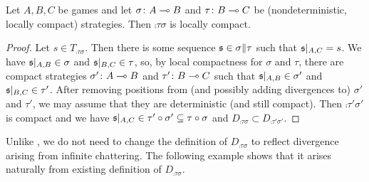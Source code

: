 \documentclass{article}
\begin{document}
\begin{proposition}
  Let $A,B,C$ be games and let $\sigma\colon A\multimap B$ and $\tau\colon B\multimap C$ be (nondeterministic, locally compact) strategies.  Then $\comp\tau\sigma$ is locally compact.
  \begin{proof}
    Let $s\in T_{\comp\tau\sigma}$.  Then there is some sequence $\mathfrak s\in\sigma\|\tau$ such that $\mathfrak s\vert_{A,C}=s$.  We have $\mathfrak s\vert_{A,B}\in\sigma$ and $\mathfrak s\vert_{B,C}\in\tau$, so, by local compactness for $\sigma$ and $\tau$, there are compact strategies $\sigma'\colon A\multimap B$ and $\tau'\colon B\multimap C$ such that $\mathfrak s\vert_{A,B}\in\sigma'$ and $\mathfrak s\vert_{B,C}\in\tau'$.  After removing positions from (and possibly adding divergences to) $\sigma'$ and $\tau'$, we may assume that they are deterministic (and still compact).  Then $\comp{\tau'}{\sigma'}$ is compact and we have $\mathfrak s\vert_{A,C}\in\tau' \circ \sigma'\subseteq\tau \circ \sigma$ and $D_{\comp\tau\sigma}\subset D_{\comp{\tau'}{\sigma'}}$.
  \end{proof}
\end{proposition}

Unlike \cite{mcCHFiniteND}, we do not need to change the definition of $D_{\comp\tau\sigma}$ to reflect divergence arising from infinite chattering.  The following example shows that it arises naturally from existing definition of $D_{\comp\tau\sigma}$.
\end{document}

